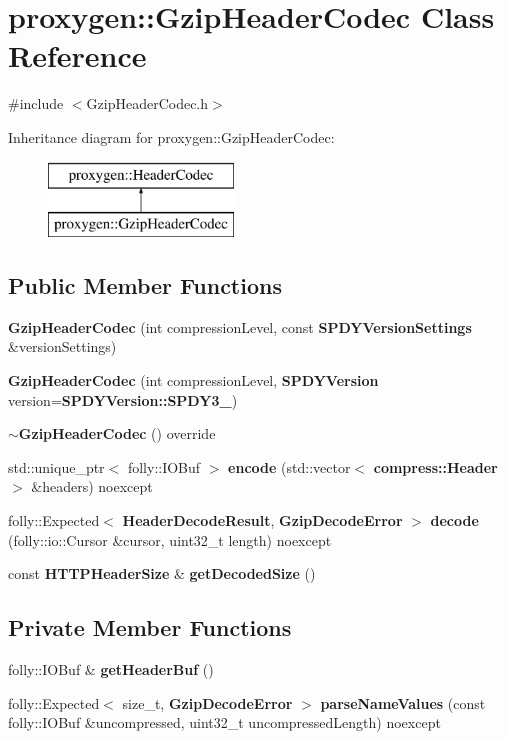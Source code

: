 \section{proxygen\+:\+:Gzip\+Header\+Codec Class Reference}
\label{classproxygen_1_1GzipHeaderCodec}


{\ttfamily \#include $<$Gzip\+Header\+Codec.\+h$>$}

Inheritance diagram for proxygen\+:\+:Gzip\+Header\+Codec\+:\begin{figure}[H]
\begin{center}
\leavevmode
\includegraphics[height=2.000000cm]{classproxygen_1_1GzipHeaderCodec}
\end{center}
\end{figure}
\subsection*{Public Member Functions}
\begin{DoxyCompactItemize}
\item 
{\bf Gzip\+Header\+Codec} (int compression\+Level, const {\bf S\+P\+D\+Y\+Version\+Settings} \&version\+Settings)
\item 
{\bf Gzip\+Header\+Codec} (int compression\+Level, {\bf S\+P\+D\+Y\+Version} version={\bf S\+P\+D\+Y\+Version\+::\+S\+P\+D\+Y3\+\_})
\item 
{\bf $\sim$\+Gzip\+Header\+Codec} () override
\item 
std\+::unique\+\_\+ptr$<$ folly\+::\+I\+O\+Buf $>$ {\bf encode} (std\+::vector$<$ {\bf compress\+::\+Header} $>$ \&headers) noexcept
\item 
folly\+::\+Expected$<$ {\bf Header\+Decode\+Result}, {\bf Gzip\+Decode\+Error} $>$ {\bf decode} (folly\+::io\+::\+Cursor \&cursor, uint32\+\_\+t length) noexcept
\item 
const {\bf H\+T\+T\+P\+Header\+Size} \& {\bf get\+Decoded\+Size} ()
\end{DoxyCompactItemize}
\subsection*{Private Member Functions}
\begin{DoxyCompactItemize}
\item 
folly\+::\+I\+O\+Buf \& {\bf get\+Header\+Buf} ()
\item 
folly\+::\+Expected$<$ size\+\_\+t, {\bf Gzip\+Decode\+Error} $>$ {\bf parse\+Name\+Values} (const folly\+::\+I\+O\+Buf \&uncompressed, uint32\+\_\+t uncompressed\+Length) noexcept
\end{DoxyCompactItemize}
